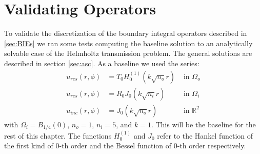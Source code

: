 \documentclass[a4paper, oneside]{thirdparty_stylesheets/discothesis}
\begin{document}
\section{Validating Operators}
To validate the discretization of the boundary integral operators described in \ref{sec:BIEs} we ran some tests computing the baseline solution to an analytically solvable case of the Helmholtz transmission problem.
The general solutions are described in section \ref{sec:asc}.
As a baseline we used the series:
\begin{align}
	u_{res}(r,\phi) &=  T_0 H_0^{(1)}(k\sqrt{n_o}r) &\text{ in } \Omega_o \\
	u_{res}(r,\phi) &=  R_0 J_0(k\sqrt{n_i}r) &\text{ in } \Omega_i \\
	u_{inc}(r,\phi) &=  J_0(k\sqrt{n_o}r) &\text{ in } \mathbb{R}^2
\end{align}
with $\Omega_i=B_{1/4}(0)$, $n_o=1$, $n_i=5$, and $k=1$.
This will be the baseline for the rest of this chapter.
The functions $H_0^{(1)}$ and $J_0$ refer to the Hankel function of the first kind of $0$-th order and the Bessel function of $0$-th order respectively. 
\end{document}
